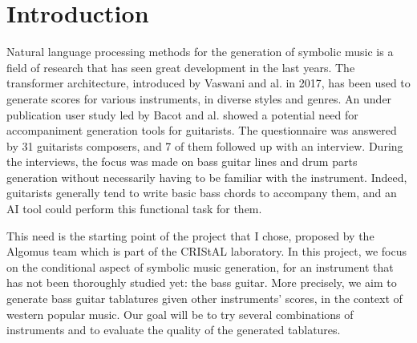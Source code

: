 \documentclass[11pt, a4paper]{article}
\begin{document}






\newpage

\section*{Introduction}

Natural language processing methods for the generation of symbolic music is a field of research that has seen great development in the last years.
The transformer architecture, introduced by Vaswani and al. in 2017, has been used to generate scores for various instruments, in diverse styles and genres\cite{vaswaniAttentionAllYou2023, leNaturalLanguageProcessing2024}.
An under publication user study led by Bacot and al. showed a potential need for accompaniment generation tools for guitarists.
The questionnaire was answered by 31 guitarists composers, and 7 of them followed up with an interview.
During the interviews, the focus was made on bass guitar lines and drum parts generation without necessarily having to be familiar with the instrument.
Indeed, guitarists generally tend to write basic bass chords to accompany them, and an AI tool could perform this functional task for them\cite{bacot_tablature_2025}.


This need is the starting point of the project that I chose, proposed by the Algomus team which is part of the CRIStAL laboratory.
In this project, we focus on the conditional aspect of symbolic music generation, for an instrument that has not been thoroughly studied yet: the bass guitar.
More precisely, we aim to generate bass guitar tablatures given other instruments' scores, in the context of western popular music.
Our goal will be to try several combinations of instruments and to evaluate the quality of the generated tablatures.
\end{document}

